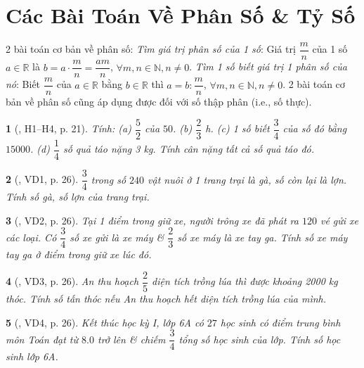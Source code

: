 \documentclass{article}
\newtheorem{baitoan}{}
\begin{document}

\section{Các Bài Toán Về Phân Số \& Tỷ Số}
2 bài toán cơ bản về phân số:  \textit{Tìm giá trị phân số của 1 số}: Giá trị $\dfrac{m}{n}$ của 1 số $a\in\mathbb{R}$ là $b = a\cdot\dfrac{m}{n} = \dfrac{am}{n}$, $\forall m,n\in\mathbb{N},n\ne0$.  \textit{Tìm 1 số biết giá trị 1 phân số của nó}: Biết $\dfrac{m}{n}$ của $a\in\mathbb{R}$ bằng $b\in\mathbb{R}$ thì $a = b:\dfrac{m}{n}$, $\forall m,n\in\mathbb{N},n\ne0$.  2 bài toán cơ bản về phân số cũng áp dụng được đối với số thập phân (i.e., số thực).

\begin{baitoan}[\cite{Binh_boi_duong_Toan_6_tap_2}, H1--H4, p. 21]
	Tính: (a) $\dfrac{5}{2}$ của $50$. (b) $\dfrac{2}{3}$ {\rm h}. (c) 1 số biết $\dfrac{3}{4}$ của số đó bằng $15000$. (d) $\dfrac{1}{4}$ số quả táo nặng {\rm3 kg}. Tính cân nặng tất cả số quả táo đó.
\end{baitoan}

\begin{baitoan}[\cite{Binh_boi_duong_Toan_6_tap_2}, VD1, p. 26]
	$\dfrac{3}{4}$ trong số $240$ vật nuôi ở 1 trang trại là gà, số còn lại là lợn. Tính số gà, số lợn của trang trại.
\end{baitoan}

\begin{baitoan}[\cite{Binh_boi_duong_Toan_6_tap_2}, VD2, p. 26]
	Tại 1 điểm trong giữ xe, người trông xe đã phát ra $120$ vé gửi xe các loại. Có $\dfrac{3}{4}$ số xe gửi là xe máy \& $\dfrac{2}{3}$ số xe máy là xe tay ga. Tính số xe máy tay ga ở điểm trong giữ xe lúc đó.
\end{baitoan}

\begin{baitoan}[\cite{Binh_boi_duong_Toan_6_tap_2}, VD3, p. 26]
	An thu hoạch $\dfrac{2}{5}$ diện tích trồng lúa thì được khoảng {\rm2000 kg} thóc. Tính số tấn thóc nếu An thu hoạch hết diện tích trồng lúa của mình.
\end{baitoan}

\begin{baitoan}[\cite{Binh_boi_duong_Toan_6_tap_2}, VD4, p. 26]
	Kết thúc học kỳ I, lớp 6A có $27$ học sinh có điểm trung bình môn Toán đạt từ $8.0$ trở lên \& chiếm $\dfrac{3}{4}$ tổng số học sinh của lớp. Tính số học sinh lớp 6A.
\end{baitoan}
\end{document}
